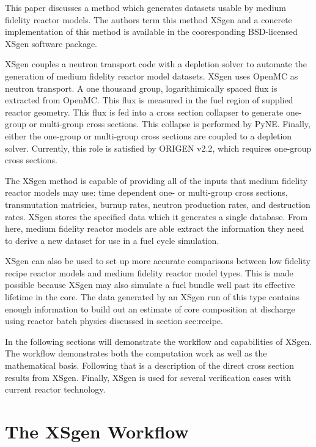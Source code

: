 \documentclass{article}
\begin{document}
This paper discusses a method which generates datasets usable by medium fidelity reactor models.
The authors term this method XSgen and a concrete implementation of this method is available
in the cooresponding BSD-licensed XSgen software package\cite{xsgen}.

XSgen couples a neutron transport code with a depletion solver to automate the generation of
medium fidelity reactor model datasets. XSgen uses OpenMC\cite{openmc} as neutron transport.
A one thousand group, logarithimically spaced flux is extracted from OpenMC. This flux is
measured in the fuel region of supplied reactor geometry. This flux is fed into a cross
section collapser to generate one-group or multi-group cross sections. This collapse is
performed by PyNE\cite{pyne}. Finally, either the
one-group or multi-group cross sections are coupled to a depletion solver. Currently, this
role is satisfied by ORIGEN v2.2\cite{origen2}, which requires one-group cross sections.

The XSgen method is capable of providing all of the inputs that medium fidelity reactor models
may use: time dependent one- or multi-group cross sections, transmutation matricies,
burnup rates, neutron production rates, and destruction rates.
XSgen stores the specified data which it generates a single database.
From here, medium fidelity reactor models are able extract the information they need to
derive a new dataset for use in a fuel cycle simulation.

XSgen can also be used to set up more accurate comparisons between low fidelity recipe reactor
models and medium fidelity reactor model types. This is made possible because XSgen may also
simulate a fuel bundle well past its effective lifetime in the core. The data generated by an
XSgen run of this type contains enough information to build out an estimate of core composition
at discharge using reactor batch physics discussed in section {sec:recipe}.

In the following sections will demonstrate the workflow and capabilities of XSgen. The workflow demonstrates 
both the computation work as well as the mathematical basis. Following that is a description of the direct cross 
section results from XSgen. Finally, XSgen is used for several verification cases with current reactor technology. 

\section{The XSgen Workflow}
\label{sec-workflow}
\end{document}
